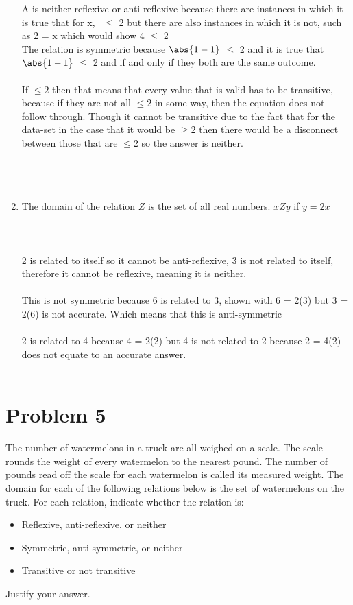 \begin{enumerate}[label=(\alph*)]
A is neither reflexive or anti-reflexive because there are instances in which it is true that for x,  \ $\leq$ 2 but there are also instances in which it is not, such as 2 = x which would show 4 $\leq$ 2
\\
The relation is symmetric because $\abs{1-1}$ $\leq$ 2
and it is true that $\abs{1-1}$ $\leq$ 2
and if and only if they both are the same outcome.
\\
\\
If $\leq2$ then that means that every value that is valid has to be transitive, because if they are not all $\leq2$ in some way, then the equation does not follow through. Though it cannot be transitive due to the fact that for the data-set in the case that it would be $\geq2$ then there would be a disconnect between those that are 
$\leq2$ so the answer is neither.
\\\\ \\
\\
\item The domain of the relation $Z$ is the set of all real numbers. $xZy$ if $y=2x$\\\\\\\\
2 is related to itself so it cannot be anti-reflexive, 3 is not related to itself, therefore it cannot be reflexive, meaning it is neither. \\
\\
This is not symmetric because 6 is related to 3, shown with 6 = 2(3) but 3 = 2(6) is not accurate. Which means that this is anti-symmetric \\
\\
2 is related to 4 because 4 = 2(2) but 4 is not related to 2 because 2 = 4(2) does not equate to an accurate answer. 
\\\\
\end{enumerate}
\newpage
\section*{Problem 5}

The number of watermelons in a truck are all weighed on a scale. The scale rounds the weight of every watermelon to the nearest pound. The number of pounds read off the scale for each watermelon is called its measured weight. The domain for each of the following relations below is the set of watermelons on the truck. For each relation, indicate whether the relation is:
\\
\begin{itemize}
  \item Reflexive, anti-reflexive, or neither
  \item Symmetric, anti-symmetric, or neither
  \item Transitive or not transitive
\end{itemize}
Justify your answer.\\

